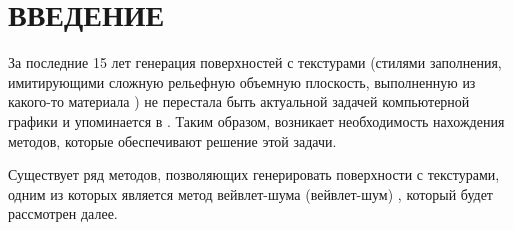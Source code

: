 \chapter*{ВВЕДЕНИЕ}

За последние 15 лет генерация поверхностей с текстурами (стилями заполнения, имитирующими сложную рельефную объемную плоскость, выполненную из какого-то материала \cite{Porev}) не перестала быть актуальной задачей компьютерной графики и упоминается в 
\cite{8942651,10042545,TRINCHAOANDRADE201228,doi:10.1080/15394450902996601,Groueix_2018_CVPR}. Таким образом, возникает необходимость нахождения методов, которые обеспечивают решение этой задачи.

Существует ряд методов, позволяющих генерировать поверхности с текстурами, одним из которых является метод вейвлет-шума (вейвлет-шум) \cite{pixar,categories}, который будет рассмотрен далее.
